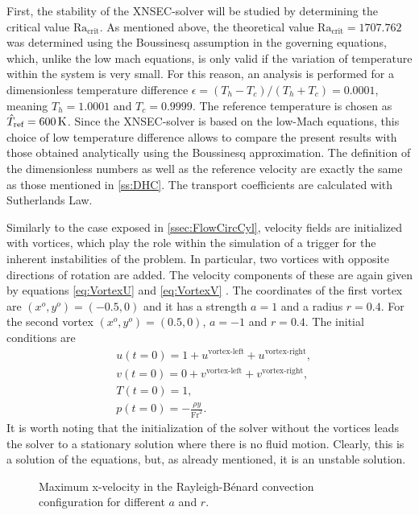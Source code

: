 First, the stability of the XNSEC-solver will be studied by determining the critical value $\text{Ra}_{\text{crit}}$. As mentioned above, the theoretical value $\text{Ra}_{\text{crit}} = 1707.762$ was determined using the Boussinesq  assumption in the governing equations, which, unlike the low mach equations, is only valid if the variation of temperature within the system is very small. For this reason, an analysis is performed for a dimensionless temperature difference $\epsilon = (T_h-T_c)/(T_h+T_c) = 0.0001$, meaning $T_h =1.0001$ and $T_c = 0.9999$. The reference temperature is chosen as $\hat T_{\text{ref}} = \SI{600}{\kelvin}$. Since the XNSEC-solver is based on the low-Mach equations, this choice of low temperature difference allows to compare the present results with those obtained analytically using the Boussinesq approximation. The definition of the dimensionless numbers as well as the reference velocity are exactly the same as those mentioned in \cref{ss:DHC}. The transport coefficients are calculated with Sutherlands Law.

Similarly to the case exposed in \cref{ssec:FlowCircCyl}, velocity fields are initialized with vortices, which play the role within the simulation of a trigger for the inherent instabilities of the problem. In particular, two vortices with opposite directions of rotation are added. The velocity components of these are again given by equations \cref{eq:VortexU} and \cref{eq:VortexV} . The coordinates of the first vortex are $(x^o,y^o) = (-0.5,0)$ and it has a strength $a = 1$ and a radius $r=0.4$. For the second vortex $(x^o,y^o) = (0.5,0)$, $a = -1$ and $r=0.4$. The initial conditions are
\begin{subequations} 
	\begin{align}
		&u(t=0) = 1 + u^{\text{vortex-left}} + u^{\text{vortex-right}},  \\
		&v(t=0) = 0 + v^{\text{vortex-left}}+ v^{\text{vortex-right}},  \\
		&T(t=0) = 1,\\
		&p(t=0) = -\frac{\rho y}{\text{Fr}^2}.
	\end{align}
\end{subequations}
It is worth noting that the initialization of the solver without the vortices leads the solver to a stationary solution where there is no fluid motion. Clearly, this is a solution of the equations, but, as already mentioned, it is an unstable solution.
\begin{figure}[bt]
	\centering
	\pgfplotsset{width=0.31\textwidth, compat=1.3}
	\hspace{0.2cm}
	\caption{Maximum x-velocity in the Rayleigh-Bénard convection configuration for different $a$ and $r$.}
	\label{fig:RayBerMaxVel}
\end{figure}

